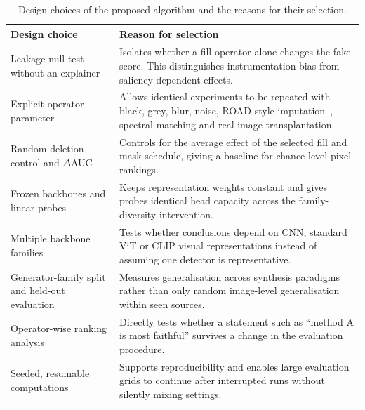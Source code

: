 \begin{table}[H]
    \centering
    \caption{Design choices of the proposed algorithm and the reasons for their selection.}
    \label{tab:design-choices}
    \small
    \begin{tabular}{@{}>{\raggedright\arraybackslash}p{}>{\raggedright\arraybackslash}p{}@{}}
        \toprule
        \textbf{Design choice} & \textbf{Reason for selection} \\
        \midrule
        Leakage null test without an explainer & Isolates whether a fill operator alone changes the fake score. This distinguishes instrumentation bias from saliency-dependent effects. \\
        \addlinespace
        Explicit operator parameter & Allows identical experiments to be repeated with black, grey, blur, noise, ROAD-style imputation~\cite{rong2022road}, spectral matching and real-image transplantation. \\
        \addlinespace
        Random-deletion control and $\Delta$AUC & Controls for the average effect of the selected fill and mask schedule, giving a baseline for chance-level pixel rankings. \\
        \addlinespace
        Frozen backbones and linear probes & Keeps representation weights constant and gives probes identical head capacity across the family-diversity intervention. \\
        \addlinespace
        Multiple backbone families & Tests whether conclusions depend on CNN, standard ViT or CLIP visual representations instead of assuming one detector is representative. \\
        \addlinespace
        Generator-family split and held-out evaluation & Measures generalisation across synthesis paradigms rather than only random image-level generalisation within seen sources. \\
        \addlinespace
        Operator-wise ranking analysis & Directly tests whether a statement such as ``method A is most faithful'' survives a change in the evaluation procedure. \\
        \addlinespace
        Seeded, resumable computations & Supports reproducibility and enables large evaluation grids to continue after interrupted runs without silently mixing settings. \\
        \bottomrule
    \end{tabular}
\end{table}

